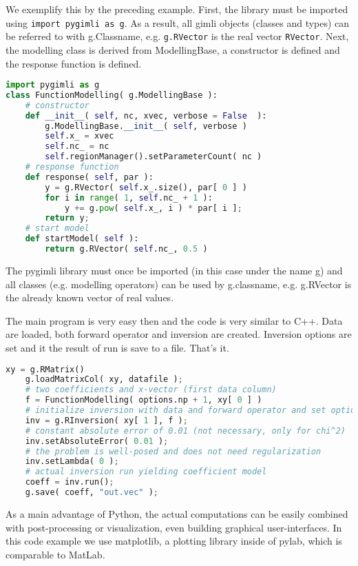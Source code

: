 We exemplify this by the preceding example.
First, the library must be imported using \lstinline|import pygimli as g|.
As a result, all gimli objects (classes and types) can be referred to with g.Classname, e.g. \lstinline|g.RVector| is the real vector \lstinline|RVector|.
Next, the modelling class is derived from ModellingBase, a constructor is defined and the response function is defined.
\begin{lstlisting}[language=python]
import pygimli as g
class FunctionModelling( g.ModellingBase ):
    # constructor
    def __init__( self, nc, xvec, verbose = False  ):
        g.ModellingBase.__init__( self, verbose )
        self.x_ = xvec
        self.nc_ = nc
        self.regionManager().setParameterCount( nc )
    # response function
    def response( self, par ):
        y = g.RVector( self.x_.size(), par[ 0 ] )
        for i in range( 1, self.nc_ + 1 ):
            y += g.pow( self.x_, i ) * par[ i ];
        return y;
    # start model
    def startModel( self ):
        return g.RVector( self.nc_, 0.5 )
\end{lstlisting}

The pygimli library must once be imported (in this case under the name g) and all classes (e.g. modelling operators) can be used by g.classname, e.g. g.RVector is the already known vector of real values.

The main program is very easy then and the code is very similar to C++.
Data are loaded, both forward operator and inversion are created.
Inversion options are set and it the result of run is save to a file.
That's it.

\begin{lstlisting}[language=python]
    xy = g.RMatrix()
    g.loadMatrixCol( xy, datafile );
    # two coefficients and x-vector (first data column)
    f = FunctionModelling( options.np + 1, xy[ 0 ] )
    # initialize inversion with data and forward operator and set options
    inv = g.RInversion( xy[ 1 ], f );
    # constant absolute error of 0.01 (not necessary, only for chi^2)
    inv.setAbsoluteError( 0.01 );
    # the problem is well-posed and does not need regularization
    inv.setLambda( 0 );
    # actual inversion run yielding coefficient model
    coeff = inv.run();
    g.save( coeff, "out.vec" );
\end{lstlisting}

As a main advantage of Python, the actual computations can be easily combined with post-processing or visualization, even building graphical user-interfaces. 
In this code example we use matplotlib, a plotting library inside of pylab, which is comparable to MatLab.

